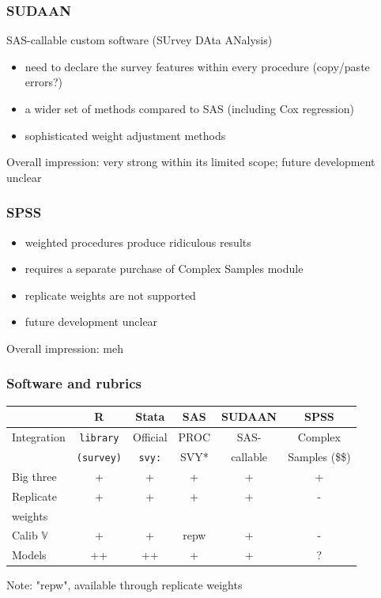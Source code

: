 \documentclass{beamer}
\begin{document}
\begin{frame}\frametitle{SUDAAN}


SAS-callable custom software (SUrvey DAta ANalysis)

\begin{itemize}
    \item need to declare the survey features within every procedure (copy/paste errors?)
    \item a wider set of methods compared to SAS (including Cox regression)
    \item sophisticated weight adjustment methods
\end{itemize}

\bigskip

Overall impression: very strong within its limited scope; future development unclear

\end{frame}

\begin{frame}\frametitle{SPSS}


\begin{itemize}
    \item weighted procedures produce ridiculous results
    \item requires a separate purchase of Complex Samples module
    \item replicate weights are not supported
    \item future development unclear
\end{itemize}

\vspace{1in}

Overall impression: meh

\end{frame}

\begin{frame}\frametitle{Software and rubrics}

\noindent
\begin{tabular}{l|ccccc}
    & R
        & Stata
            & SAS
                & SUDAAN
                    & SPSS \\
\hline
Integration
    & \texttt{library}
        & Official
            & PROC
                & SAS-
                    & Complex \\
    & \texttt{(survey)}
        & \texttt{svy:}
            & SVY*
                & callable
                    & Samples (\$\$) \\
Big three & + & + & + & + & + \\
Replicate & + & + & + & + & - \\
weights & \\
Calib $\mathbb{V}$
    & + & + & repw & + & - \\
Models & ++ & ++ & + & + & ? \\
\end{tabular}

Note: "repw", available through replicate weights

\end{frame}
\end{document}
